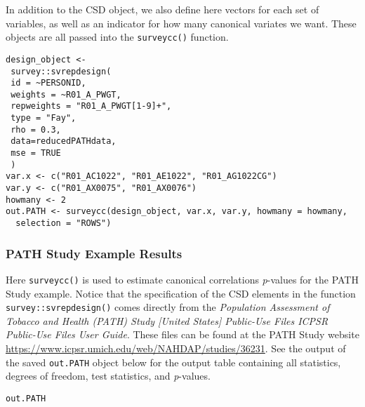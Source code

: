 In addition to the CSD object, we also define here vectors for each set of variables, as well as an indicator for how many canonical variates we want. These objects are all passed into the \texttt{surveycc()} function.

\begin{verbatim}
design_object <-
 survey::svrepdesign(
 id = ~PERSONID,
 weights = ~R01_A_PWGT,
 repweights = "R01_A_PWGT[1-9]+",
 type = "Fay",
 rho = 0.3,
 data=reducedPATHdata,
 mse = TRUE
 )
var.x <- c("R01_AC1022", "R01_AE1022", "R01_AG1022CG")
var.y <- c("R01_AX0075", "R01_AX0076")
howmany <- 2
out.PATH <- surveycc(design_object, var.x, var.y, howmany = howmany,
  selection = "ROWS")
\end{verbatim}

\hypertarget{path-study-example-results}{%
\subsubsection{PATH Study Example Results}\label{path-study-example-results}}

Here \texttt{surveycc()} is used to estimate canonical correlations \emph{p}-values for the PATH Study example. Notice that the specification of the CSD elements in the function \texttt{survey::svrepdesign()} comes directly from the \emph{Population Assessment of Tobacco and Health (PATH) Study {[}United States{]} Public-Use Files ICPSR Public-Use Files User Guide}. These files can be found at the PATH Study website \url{https://www.icpsr.umich.edu/web/NAHDAP/studies/36231}. See the output of the saved \texttt{out.PATH} object below for the output table containing all statistics, degrees of freedom, test statistics, and \emph{p}-values.

\begin{verbatim}
out.PATH
\end{verbatim}

